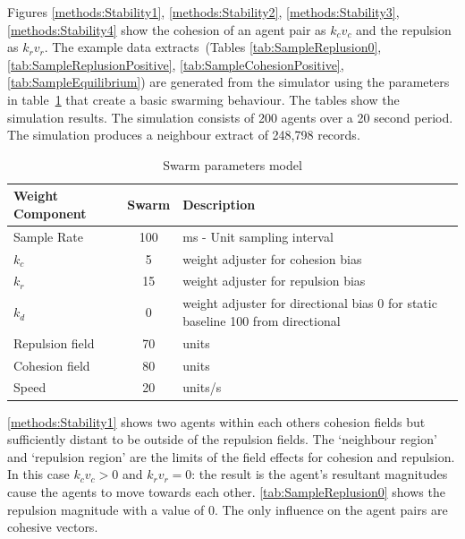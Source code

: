 Figures \ref{methods:Stability1}, \ref{methods:Stability2}, \ref{methods:Stability3}, \ref{methods:Stability4} show the cohesion of an agent pair as $k_cv_c$ and the repulsion as $k_rv_r$. The example data extracts~(Tables \ref{tab:SampleReplusion0}, \ref{tab:SampleReplusionPositive}, \ref{tab:SampleCohesionPositive}, \ref{tab:SampleEquilibrium}) are generated from the simulator using the parameters in table~\ref{tab:MetricPhysics1} that create a basic swarming behaviour. The tables show the simulation results. The simulation consists of 200 agents over a 20 second period. The simulation produces a neighbour extract of 248,798 records.

\begin{table}[H]
\begin{center}
\begin{tabular}{| p{2.5cm} | c | p{7cm} |}
\hline
\bf Weight \bf Component & \bf Swarm & \bf Description \\ \hline
Sample Rate & 100 & ms - Unit sampling interval\\  \hline
$k_c$ & 5 & weight adjuster for cohesion bias\\  \hline
$k_r$ & 15 & weight adjuster for repulsion  bias\\  \hline
$k_d$ & 0 & weight adjuster for directional bias 0 for static baseline 100 from directional\\  \hline
Repulsion field & 70 & units\\  \hline
Cohesion field & 80 & units\\  \hline
Speed & 20 & units/s\\  \hline
\end{tabular}\caption{Swarm parameters model} \label{tab:MetricPhysics1}
\end{center}
\end{table}

\autoref{methods:Stability1} shows two agents within each others cohesion fields but sufficiently distant to be outside of the repulsion fields. The `neighbour region' and `repulsion region' are the limits of the field effects for cohesion and repulsion. In this case $k_cv_c > 0$ and $k_rv_r = 0$: the result is the agent's resultant magnitudes cause the agents to move towards each other. \autoref{tab:SampleReplusion0} shows the repulsion magnitude with a value of 0. The only influence on the agent pairs are cohesive vectors. 

